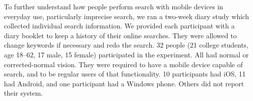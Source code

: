 


To further understand how people perform search with mobile devices in everyday use, particularly imprecise search, we ran a two-week diary study which collected individual search information. We provided each participant with a diary booklet to keep a history of their online searches. They were allowed to change keywords if necessary and redo the search. 32 people (21 college students, age 18--62, 17 male, 15 female) participated in the experiment. All had normal or corrected-normal vision. They were required to have a mobile device capable of search, and to be regular users of that functionality. 10 participants had iOS, 11 had Android, and one participant had a Windows phone. Others did not report their system.




